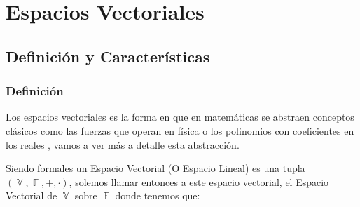 \documentclass[12pt, fleqn]{report}                             %
\theoremstyle{break}                                            %
\DeclareMathOperator \GenericField {\mathbb{F}}                 %
\DeclareMathOperator \VectorSet    {\mathbb{V}}                 %
\begin{document}
\part{Espacios Vectoriales}
\clearpage


    \chapter{Definición y Características}

        \clearpage
        \section{Definición}

            Los espacios vectoriales es la forma en que en matemáticas se abstraen conceptos clásicos como las
            fuerzas que operan en física o los polinomios con coeficientes en los reales , vamos a ver más a detalle
            esta abstracción.

            Siendo formales un Espacio Vectorial (O Espacio Lineal) es una tupla 
            $(\VectorSet, \GenericField, +, \cdot)$, solemos llamar entonces a este espacio vectorial, 
            el Espacio Vectorial de $\VectorSet$ sobre $\GenericField$ donde tenemos que:
            
\end{document}
